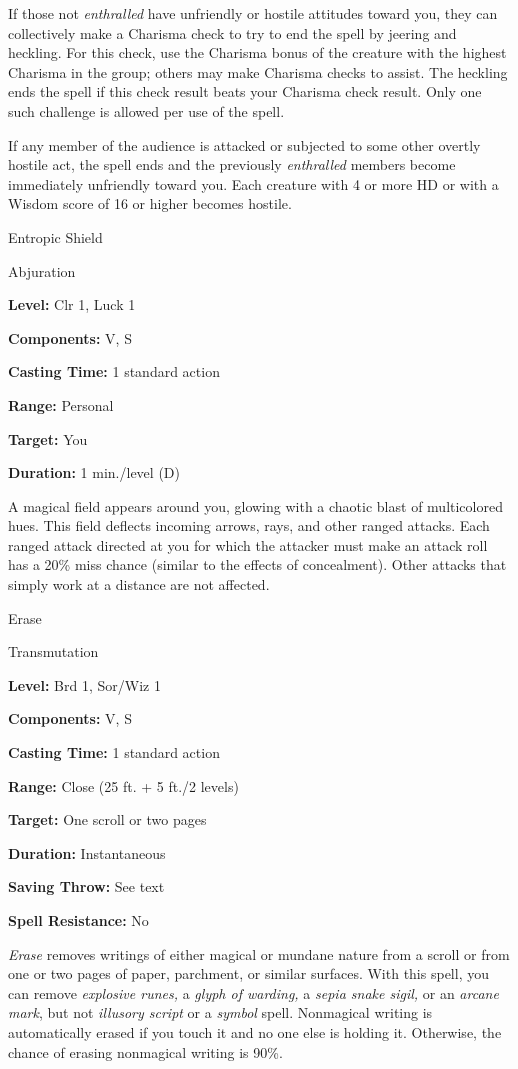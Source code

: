 \documentclass{article}
\begin{document}
If those not \textit{enthralled }have unfriendly or hostile attitudes toward you, 
they can collectively make a Charisma check to try to end the spell by jeering 
and heckling. For this check, use the Charisma bonus of the creature with the highest 
Charisma in the group; others may make Charisma checks to assist. The heckling 
ends the spell if this check result beats your Charisma check result. Only one 
such challenge is allowed per use of the spell.

If any member of the audience is attacked or subjected to some other overtly hostile 
act, the spell ends and the previously \textit{enthralled }members become immediately 
unfriendly toward you. Each creature with 4 or more HD or with a Wisdom score of 
16 or higher becomes hostile.

\vspace{12pt}
Entropic Shield

Abjuration

\textbf{Level:} Clr 1, Luck 1

\textbf{Components:} V, S

\textbf{Casting Time:} 1 standard action

\textbf{Range:} Personal

\textbf{Target:} You

\textbf{Duration:} 1 min./level (D)

A magical field appears around you, glowing with a chaotic blast of multicolored 
hues. This field deflects incoming arrows, rays, and other ranged attacks. Each 
ranged attack directed at you for which the attacker must make an attack roll has 
a 20\% miss chance (similar to the effects of concealment). Other attacks that 
simply work at a distance are not affected.

\vspace{12pt}
Erase

Transmutation

\textbf{Level:} Brd 1, Sor/Wiz 1

\textbf{Components:} V, S

\textbf{Casting Time:} 1 standard action

\textbf{Range:} Close (25 ft. + 5 ft./2 levels)

\textbf{Target:} One scroll or two pages

\textbf{Duration:} Instantaneous

\textbf{Saving Throw:} See text

\textbf{Spell Resistance:} No

\textit{Erase }removes writings of either magical or mundane nature from a scroll 
or from one or two pages of paper, parchment, or similar surfaces. With this spell, 
you can remove \textit{explosive runes, }a \textit{glyph of warding, }a \textit{sepia 
snake sigil, }or an \textit{arcane mark}, but not \textit{illusory script }or a 
\textit{symbol }spell. Nonmagical writing is automatically erased if you touch 
it and no one else is holding it. Otherwise, the chance of erasing nonmagical writing 
is 90\%.
\end{document}
